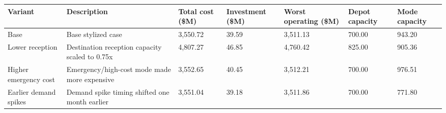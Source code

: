 \begin{tabular}{lllllll}
\toprule
Variant & Description & Total cost (\$M) & Investment (\$M) & Worst operating (\$M) & Depot capacity & Mode capacity \\
\midrule
Base & Base stylized case & 3,550.72 & 39.59 & 3,511.13 & 700.00 & 943.20 \\
Lower reception & Destination reception capacity scaled to 0.75x & 4,807.27 & 46.85 & 4,760.42 & 825.00 & 905.36 \\
Higher emergency cost & Emergency/high-cost mode made more expensive & 3,552.65 & 40.45 & 3,512.21 & 700.00 & 976.51 \\
Earlier demand spikes & Demand spike timing shifted one month earlier & 3,551.04 & 39.18 & 3,511.86 & 700.00 & 771.80 \\
\bottomrule
\end{tabular}
